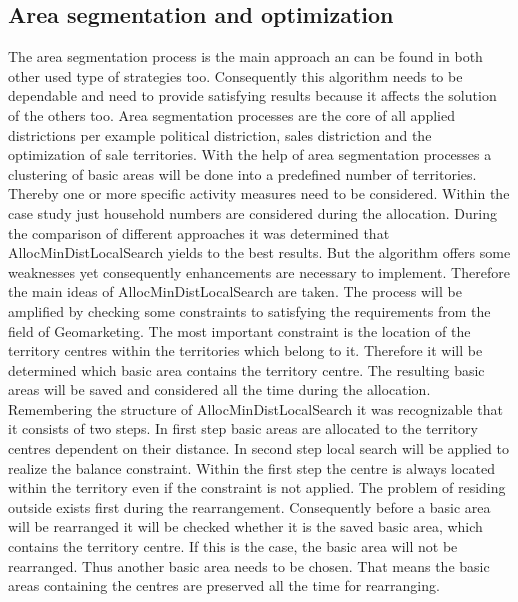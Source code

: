 \subsection{Area segmentation and optimization}\label{areaseg}
The area segmentation process is the main approach an can be found in both other used type of strategies too. Consequently this algorithm needs to be dependable and need to provide satisfying results because it affects the solution of the others too. Area segmentation processes are the core of all applied districtions per example political distriction, sales distriction and the optimization of sale territories. With the help of area segmentation processes a clustering of basic areas will be done into a predefined number of territories. Thereby one or more specific activity measures need to be considered. Within the case study just household numbers are considered during the allocation. During the comparison of different approaches it was determined that AllocMinDistLocalSearch yields to the best results. But the algorithm offers some weaknesses yet consequently enhancements are necessary to implement. Therefore the main ideas of AllocMinDistLocalSearch are taken. The process will be amplified by checking some constraints to satisfying the requirements from the field of Geomarketing. The most important constraint is the location of the territory centres within the territories which belong to it. Therefore it will be determined which basic area contains the territory centre. The resulting basic areas will be saved and considered all the time during the allocation. Remembering the structure of AllocMinDistLocalSearch it was recognizable that it consists of two steps. In first step basic areas are allocated to the territory centres dependent on their distance. In second step local search will be applied to realize the balance constraint. Within the first step the centre is always located within the territory even if the constraint is not applied. The problem of residing outside exists first during the rearrangement. Consequently before a basic area will be rearranged it will be checked whether it is the saved basic area, which contains the territory centre. If this is the case, the basic area will not be rearranged. Thus another basic area needs to be chosen. That means the basic areas containing the centres are preserved all the time for rearranging. \\
